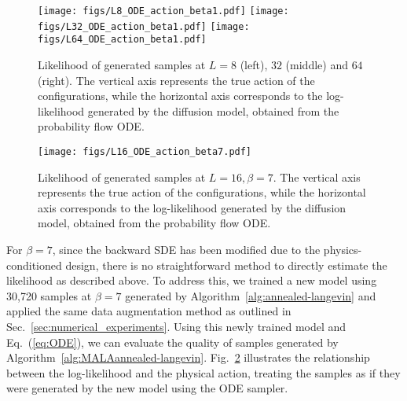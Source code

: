 \documentclass[a4paper,11pt]{article}
\begin{document}
\begin{figure}[hbpt!]
\begin{center}
    \texttt{[image: figs/L8\_ODE\_action\_beta1.pdf]}
    \texttt{[image: figs/L32\_ODE\_action\_beta1.pdf]}
    \texttt{[image: figs/L64\_ODE\_action\_beta1.pdf]}
\end{center}
\caption{
    Likelihood of generated samples at $L=8$ (left), $32$ (middle) and $64$ (right). The vertical axis represents the true action of the configurations, while the horizontal axis corresponds to the log-likelihood generated by the diffusion model, obtained from the probability flow ODE.
}
\label{fig:beta-1}
\end{figure}

\begin{figure}[hbpt!]
\centering
\texttt{[image: figs/L16\_ODE\_action\_beta7.pdf]}
\caption{
    Likelihood of generated samples at $L=16, \beta = 7$. The vertical axis represents the true action of the configurations, while the horizontal axis corresponds to the log-likelihood generated by the diffusion model, obtained from the probability flow ODE.
}
\label{fig:likelihood-beta-7}
\end{figure}

For $\beta = 7$, since the backward SDE has been modified due to the physics-conditioned design, there is no straightforward method to directly estimate the likelihood as described above. To address this, we trained a new model using 30,720 samples at $\beta = 7$ generated by Algorithm~\ref{alg:annealed-langevin} and applied the same data augmentation method as outlined in Sec.~\ref{sec:numerical_experiments}. Using this newly trained model and Eq.~(\ref{eq:ODE}), we can evaluate the quality of samples generated by Algorithm~\ref{alg:MALAannealed-langevin}. Fig.~\ref{fig:likelihood-beta-7} illustrates the relationship between the log-likelihood and the physical action, treating the samples as if they were generated by the new model using the ODE sampler.





\end{document}
